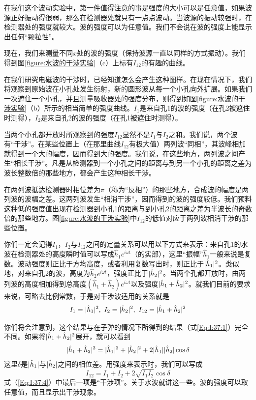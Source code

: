 在我们这个波动实验中，第一件值得注意的事是强度的大小可以是任意值，如果波源正好振动得很弱，那么在检测器处就只有一点点波动。当波源的振动较强时，在检测器处的强度就较大。波的强度可以为任意值。我们不会说在波的强度上能显示出任何“颗粒性”。

现在，我们来测量不同$x$处的波的强度（保持波源一直以同样的方式振动）。我们得到图\ref{figure:水波的干涉实验}（c）上标有$I_{12}$的有趣的曲线。

在我们研究电磁波的干涉时，已经知道怎么会产生这种图样。在现在情况下，我们将观察到原始波在小孔处发生衍射，新的圆形波从每一个小孔向外扩展。如果我们一次遮住一个小孔，并且测量吸收器处的强度分布，则得到如图\ref{figure:水波的干涉实验}（b）所示的相当简单的强度曲线。$I_1$是来自孔1的波的强度（在孔2被遮住时测得），$I_2$是来自孔2的波的强度（在孔1被遮住时测得）。

当两个小孔都开放时所观察到的强度$I_{12}$显然不是$I_1$与$I_2$之和。我们说，两个波有“干涉”。在某些位置上（在那里曲线$I_{12}$有极大值）两列波“同相”，其波峰相加就得到一个大的幅度，因而得到大的强度。我们说，在这些地方，两列波之间产生“相长干涉”。凡是从检测器到一个小孔之间的距离与到另一个小孔的距离之差为波长整数倍的那些地方，都会产生这种相长干涉。

在两列波抵达检测器时相位差为$\pi$（称为“反相”）的那些地方，合成波的幅度是两列波的波幅之差。这两列波发生“相消干涉”，因而得到的波的强度较低。我们预料这种低的强度值出现在检测器到小孔1的距离与到小孔2的距离之差为半波长的奇数倍的那些地方。图\ref{figure:水波的干涉实验}中$I_{12}$的低值对应于两列波相消干涉的那些位置。

你们一定会记得$I_1$，$I_2$与$I_{12}$之间的定量关系可以用以下方式来表示：来自孔1的水波在检测器处的高度瞬时值可以写成$\hat{h}_1e^{i\omega t}$（的实部），这里“振幅”$\hat{h}_1$一般来说是复数。波动强度则正比于方均高度，或者利用复数写出时，则正比于$\lvert\hat{h}_1\rvert^2$。类似地，对来自孔2的波，高度为$\hat{h}_2e^{i\omega t}$，强度正比于$\lvert\hat{h}_2\rvert^2$。当两个孔都开放时，由两列波的高度相加得到总高度$(\hat{h}_1 + \hat{h}_2)e^{i\omega t}$以及强度$\lvert\hat{h}_1 + \hat{h}_2\rvert^2$。就我们目前的要求来说，可略去比例常数，于是对干涉波适用的关系就是
\begin{equation}
    \label{Eq:I:37:2}
    I_1 = \lvert\hat{h}_1\rvert^2,~I_2 = \lvert\hat{h}_2\rvert^2,~I_{12} = \lvert\hat{h}_1 + \hat{h}_2\rvert^2
\end{equation}

你们将会注意到，这个结果与在子弹的情况下所得到的结果（式\ref{Eq:I:37:1}）完全不同。如果将$\lvert\hat{h}_1 + \hat{h}_2\rvert^2$展开，就可以看到
\begin{equation}
    \label{Eq:I:37:3}
    \lvert\hat{h}_1 + \hat{h}_2\rvert^2 = \lvert\hat{h}_1\rvert^2 + \lvert\hat{h}_2\rvert^2 + 2\lvert\hat{h}_1\rvert\lvert\hat{h}_2\rvert\cos\delta
\end{equation}
这里$\delta$是$\lvert\hat{h}_1\rvert$与$\lvert\hat{h}_2\rvert$之间的相位差。用强度来表示时，我们可以写成
\begin{equation}
    \label{Eq:I:37:4}
    I_{12} = I_1 + I_2 + 2\sqrt{I_1I_2}\cos\delta
\end{equation}
式（\ref{Eq:I:37:4}）中最后一项是“干涉项”。关于水波就讲这一些。波的强度可以取任意值，而且显示出干涉现象。

